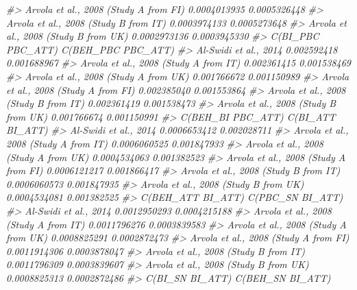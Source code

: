 \documentclass[
]{book}
\newenvironment{Shaded}{\begin{snugshade}}{\end{snugshade}}
\newcommand{\CommentTok}[1]{\textcolor[rgb]{0.56,0.35,0.01}{\textit{#1}}}
\begin{document}
\begin{Shaded}
\begin{Highlighting}[]
\CommentTok{\#\textgreater{} Arvola et al., 2008 (Study A from FI)     0.0004013935      0.0005326448}
\CommentTok{\#\textgreater{} Arvola et al., 2008 (Study B from IT)     0.0003974133      0.0005273648}
\CommentTok{\#\textgreater{} Arvola et al., 2008 (Study B from UK)     0.0002973136      0.0003945330}
\CommentTok{\#\textgreater{}                                       C(BI\_PBC PBC\_ATT) C(BEH\_PBC PBC\_ATT)}
\CommentTok{\#\textgreater{} Al{-}Swidi et al., 2014                       0.002592418        0.001688967}
\CommentTok{\#\textgreater{} Arvola et al., 2008 (Study A from IT)       0.002361415        0.001538469}
\CommentTok{\#\textgreater{} Arvola et al., 2008 (Study A from UK)       0.001766672        0.001150989}
\CommentTok{\#\textgreater{} Arvola et al., 2008 (Study A from FI)       0.002385040        0.001553864}
\CommentTok{\#\textgreater{} Arvola et al., 2008 (Study B from IT)       0.002361419        0.001538473}
\CommentTok{\#\textgreater{} Arvola et al., 2008 (Study B from UK)       0.001766674        0.001150991}
\CommentTok{\#\textgreater{}                                       C(BEH\_BI PBC\_ATT) C(BI\_ATT BI\_ATT)}
\CommentTok{\#\textgreater{} Al{-}Swidi et al., 2014                      0.0006653412      0.002028711}
\CommentTok{\#\textgreater{} Arvola et al., 2008 (Study A from IT)      0.0006060525      0.001847933}
\CommentTok{\#\textgreater{} Arvola et al., 2008 (Study A from UK)      0.0004534063      0.001382523}
\CommentTok{\#\textgreater{} Arvola et al., 2008 (Study A from FI)      0.0006121217      0.001866417}
\CommentTok{\#\textgreater{} Arvola et al., 2008 (Study B from IT)      0.0006060573      0.001847935}
\CommentTok{\#\textgreater{} Arvola et al., 2008 (Study B from UK)      0.0004534081      0.001382525}
\CommentTok{\#\textgreater{}                                       C(BEH\_ATT BI\_ATT) C(PBC\_SN BI\_ATT)}
\CommentTok{\#\textgreater{} Al{-}Swidi et al., 2014                      0.0012950293     0.0004215188}
\CommentTok{\#\textgreater{} Arvola et al., 2008 (Study A from IT)      0.0011796276     0.0003839583}
\CommentTok{\#\textgreater{} Arvola et al., 2008 (Study A from UK)      0.0008825291     0.0002872473}
\CommentTok{\#\textgreater{} Arvola et al., 2008 (Study A from FI)      0.0011914306     0.0003878047}
\CommentTok{\#\textgreater{} Arvola et al., 2008 (Study B from IT)      0.0011796309     0.0003839607}
\CommentTok{\#\textgreater{} Arvola et al., 2008 (Study B from UK)      0.0008825313     0.0002872486}
\CommentTok{\#\textgreater{}                                       C(BI\_SN BI\_ATT) C(BEH\_SN BI\_ATT)}

\end{Highlighting}
\end{Shaded}
\end{document}
